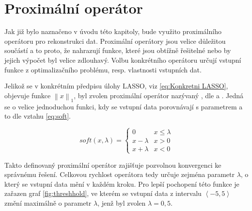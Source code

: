 \documentclass[FM,BP]{tulthesis}
\newcounter{Vzorce}
\begin{document}
\section{Proximální operátor}
\label{subch:proxOpt}
Jak již bylo naznačeno v úvodu této kapitoly, bude využito proximálního operátoru pro rekonstrukci dat. Proximální operátory jsou velice důležitou součástí a to proto, že nahrazují funkce, které jsou obtížně řešitelné nebo by jejich výpočet byl velice zdlouhavý. Volbu konkrétního operátoru určují vstupní funkce z optimalizačního problému, resp. vlastnosti vstupních dat. 

Jelikož se v konkrétním předpisu úlohy LASSO, viz \ref{eq:Konkretni LASSO}, objevuje funkce $\left\| x\right\| _1$, byl zvolen proximální operátor nazývaný , dle \cite{proxAlg1} a \cite{proxAlg2}. Jedná se o velice jednoduchou funkci, kdy se vstupní data porovnávají s parametrem a to dle vztahu \ref{eq:soft}. 

\begin{equation} \label{eq:soft} \tag{Vzorec \theVzorce}
soft(x, \lambda) = \begin{cases}
0  & x \leq \lambda\\
x - \lambda & x > 0\\
x + \lambda & x < 0
\end{cases}
\end{equation}
 
 Takto definovaný proximální operátor zajišťuje pozvolnou konvergenci ke správnému řešení. Celkovou rychlost operátora tedy určuje zejména parametr $\lambda$, o který se vstupní data mění v každém kroku. Pro lepší pochopení této funkce je zařazen graf \ref{fig:threshhold}, ve kterém se vstupní data z intervalu $\left\langle -5, 5\right\rangle $ změní maximálně o parametr $\lambda$, jenž byl zvolen $\lambda = 0,5$.
 
\end{document}
